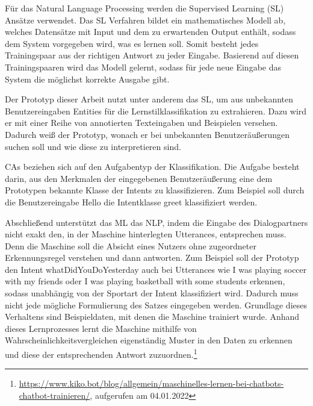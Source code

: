         Für das Natural Language Processing werden die Supervised Learning (SL) Ansätze verwendet.
        Das SL Verfahren bildet ein mathematisches Modell ab, welches Datensätze mit Input und 
        dem zu erwartenden Output enthält, sodass dem System vorgegeben wird, was es lernen soll.
        Somit besteht jedes Trainingspaar aus der richtigen Antwort zu jeder Eingabe. Basierend auf diesen 
        Trainingspaaren wird das Modell gelernt, sodass für jede neue Eingabe das System die möglichst  
        korrekte Ausgabe gibt. \parencite[5]{Kong.2021}\parencite[39]{deru.2020}
    
        Der Prototyp dieser Arbeit nutzt unter anderem das SL, um aus unbekannten Benutzereingaben Entities für die Lernstilklassifikation zu extrahieren. 
        Dazu wird er mit einer Reihe von annotierten Texteingaben und 
        Beispielen versehen. Dadurch weiß der Prototyp, wonach er bei unbekannten Benutzeräußerungen 
        suchen soll und wie diese zu interpretieren sind.
           
        CAs beziehen sich auf den Aufgabentyp der Klassifikation.
        Die Aufgabe besteht darin, aus den Merkmalen der eingegebenen Benutzeräußerung
        eine dem Prototypen bekannte Klasse der Intents zu klassifizieren. \parencite[39]{deru.2020} \parencite[37 f.]{gentsch.2018}
        Zum Beispiel 
        soll durch die Benutzereingabe \glqq Hello\grqq{} die Intentklasse \glqq greet\grqq{}
        klassifiziert werden.

        Abschließend unterstützt das ML das NLP, indem die Eingabe des Dialogpartners nicht exakt den, in der Maschine hinterlegten Utterances, 
        entsprechen muss. Denn die Maschine soll die Absicht eines Nutzers ohne zugeordneter Erkennungsregel verstehen und dann antworten. \parencite[142]{Sieber.2019}
        Zum Beispiel soll der Prototyp den Intent \glqq whatDidYouDoYesterday\grqq{} auch bei Utterances wie 
        \glqq I was playing soccer with my friends\grqq{}  oder \glqq I was playing basketball with some students\grqq{} erkennen, sodass 
        unabhängig von der Sportart der Intent klassifiziert wird.
        Dadurch muss nicht jede mögliche Formulierung des Satzes eingegeben werden.
        Grundlage dieses Verhaltens sind Beispieldaten, mit denen die Maschine trainiert wurde. Anhand dieses Lernprozesses lernt 
        die Maschine mithilfe von Wahrscheinlichkeitsvergleichen eigenständig Muster in den Daten zu erkennen und diese der entsprechenden 
        Antwort zuzuordnen.\footnote{\url{ https://www.kiko.bot/blog/allgemein/maschinelles-lernen-bei-chatbots-chatbot-trainieren/}, aufgerufen am 04.01.2022}



